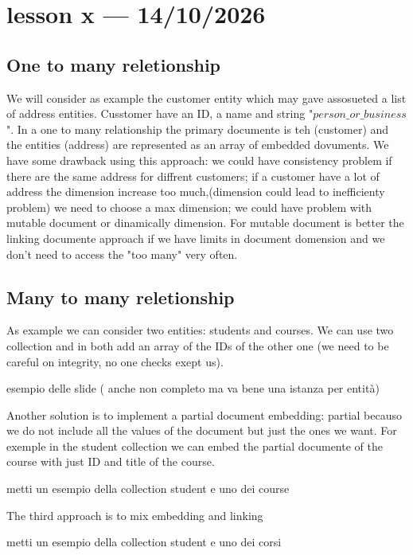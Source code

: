 \section{lesson x --- 14/10/2026}

\subsection{One to many reletionship}
We will consider as example the customer entity which may gave assosueted a list of address entities. Cusstomer have an ID, a name and string "$person\_or\_business$". In a one to many relationship the primary documente is teh  (customer) and the  entities (address) are represented as an array of embedded dovuments. We have some drawback using this approach: we could have consistency problem if there are the same address for diffrent customers; if a customer have a lot of address the dimension increase too much,(dimension could lead to inefficienty problem) we need to choose a max dimension; we could have problem with mutable document or dinamically dimension. For mutable document is better the linking documente approach if we have limits in document domension and we don't need to access the "too many" very often. 

\subsection{Many to many reletionship}
As example we can consider two entities: students and courses. We can use two collection and in both add an array of the IDs of the other one (we need to be careful on integrity, no one checks exept us). 

esempio delle slide ( anche non completo ma va bene una istanza per entità)

Another solution is to implement a partial document embedding: partial becauso we do not include all the values of the document but just the ones we want. For exemple in the student collection we can embed the partial documente of the course with just ID and title of the course.

metti un esempio della collection student e uno dei course

The third approach is to mix embedding and linking

metti un esempio della collection student e uno dei corsi